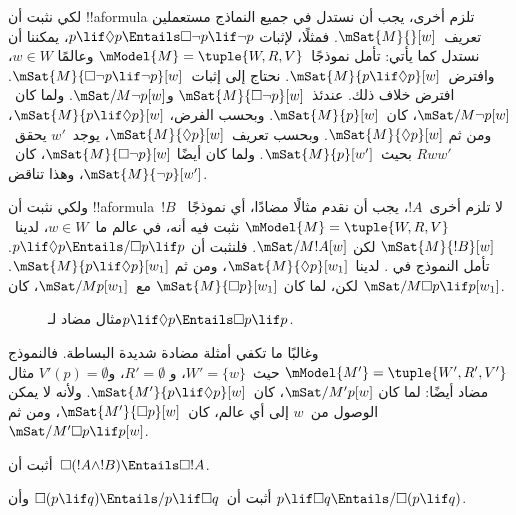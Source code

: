 \documentclass[../../../include/open-logic-section]{subfiles}
\begin{document}
\begin{ex}
  لكي نثبت أن !!a{formula} تلزم أخرى، يجب أن نستدل في جميع النماذج
  مستعملين تعريف~$\mSat{M}{}[w]$. فمثلًا، لإثبات
  $p \lif \Diamond p \Entails \Box\lnot p \lif \lnot p$، يمكننا أن
  نستدل كما يأتي: تأمل نموذجًا~$\mModel{M} = \tuple{W, R, V}$ وعالمًا
  $w \in W$، وافترض~$\mSat{M}{p \lif \Diamond p}[w]$. نحتاج إلى
  إثبات~$\mSat{M}{\Box\lnot p \lif \lnot p}[w]$. افترض خلاف ذلك.
  عندئذ~$\mSat{M}{\Box\lnot p}[w]$ و$\mSat/{M}{\lnot p}[w]$. ولما
  كان~$\mSat/{M}{\lnot p}[w]$، كان~$\mSat{M}{p}[w]$. وبحسب الفرض،
  $\mSat{M}{p \lif \Diamond p}[w]$، ومن ثم
  $\mSat{M}{\Diamond p}[w]$. وبحسب تعريف~$\mSat{M}{\Diamond p}[w]$،
  يوجد~$w'$ يحقق~$Rww'$ بحيث~$\mSat{M}{p}[w']$. ولما كان أيضًا
  $\mSat{M}{\Box \lnot p}[w]$، كان~$\mSat{M}{\lnot p}[w']$، وهذا
  تناقض.

  ولكي نثبت أن !!a{formula}~$!B$ لا تلزم أخرى~$!A$، يجب أن نقدم
  مثالًا مضادًا، أي نموذجًا~$\mModel{M} = \tuple{W, R, V}$ نثبت فيه
  أنه، في عالم ما~$w \in W$، لدينا~$\mSat{M}{!B}[w]$ لكن
  $\mSat/{M}{!A}[w]$. فلنثبت أن
  $p \lif \Diamond p \Entails/ \Box p \lif p$. تأمل النموذج في
  . لدينا~$\mSat{M}{\Diamond p}[w_1]$، ومن ثم
  $\mSat{M}{p \lif \Diamond p}[w_1]$. لكن، لما كان
  $\mSat{M}{\Box p}[w_1]$ مع~$\mSat/{M}{p}[w_1]$، كان
  $\mSat/{M}{\Box p \lif p}[w_1]$.
  \begin{figure}
  \begin{center}
  \end{center}
  \caption{مثال مضاد لـ$p \lif \Diamond p
  \Entails \Box p \lif p$.}
  \end{figure}

  وغالبًا ما تكفي أمثلة مضادة شديدة البساطة. فالنموذج
  $\mModel{M'} = \tuple{W', R', V'}$ حيث~$W' = \{w\}$، و
  $R' = \emptyset$، و$V'(p) = \emptyset$ مثال مضاد أيضًا: لما كان
  $\mSat/{M'}{p}[w]$، كان~$\mSat{M'}{p \lif \Diamond p}[w]$. ولأنه
  لا يمكن الوصول من~$w$ إلى أي عالم، كان~$\mSat{M'}{\Box p}[w]$، ومن
  ثم~$\mSat/{M'}{\Box p \lif p}[w]$.
\end{ex}

\begin{prob}
  أثبت أن~$\Box (!A \land !B) \Entails \Box !A$.
\end{prob}

\begin{prob}
  أثبت أن~$\Box (p \lif q) \Entails/ p \lif \Box q$ وأن
  $p \lif \Box q \Entails/\Box (p \lif q)$.
\end{prob}
\end{document}
